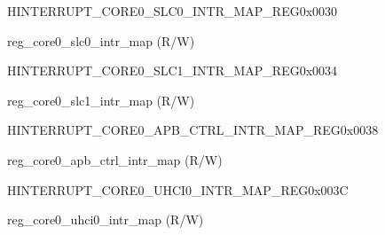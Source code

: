 \begin{register}{H}{INTERRUPT\_CORE0\_SLC0\_INTR\_MAP\_REG}{0x0030}\label{regdesc:INTERRUPTCORE0SLC0INTRMAPREG}
%
%
\regnewline%
\begin{regdesc}\begin{reglist}
\label{fielddesc:INTERRUPTCORE0SLC0INTRMAP}\item [INTERRUPT\_CORE0\_SLC0\_INTR\_MAP] reg\_core0\_slc0\_intr\_map (R/W)
\end{reglist}\end{regdesc}
\end{register}


\begin{register}{H}{INTERRUPT\_CORE0\_SLC1\_INTR\_MAP\_REG}{0x0034}\label{regdesc:INTERRUPTCORE0SLC1INTRMAPREG}
%
%
\regnewline%
\begin{regdesc}\begin{reglist}
\label{fielddesc:INTERRUPTCORE0SLC1INTRMAP}\item [INTERRUPT\_CORE0\_SLC1\_INTR\_MAP] reg\_core0\_slc1\_intr\_map (R/W)
\end{reglist}\end{regdesc}
\end{register}


\begin{register}{H}{INTERRUPT\_CORE0\_APB\_CTRL\_INTR\_MAP\_REG}{0x0038}\label{regdesc:INTERRUPTCORE0APBCTRLINTRMAPREG}
%
%
\regnewline%
\begin{regdesc}\begin{reglist}
\label{fielddesc:INTERRUPTCORE0APBCTRLINTRMAP}\item [INTERRUPT\_CORE0\_APB\_CTRL\_INTR\_MAP] reg\_core0\_apb\_ctrl\_intr\_map (R/W)
\end{reglist}\end{regdesc}
\end{register}


\begin{register}{H}{INTERRUPT\_CORE0\_UHCI0\_INTR\_MAP\_REG}{0x003C}\label{regdesc:INTERRUPTCORE0UHCI0INTRMAPREG}
%
%
\regnewline%
\begin{regdesc}\begin{reglist}
\label{fielddesc:INTERRUPTCORE0UHCI0INTRMAP}\item [INTERRUPT\_CORE0\_UHCI0\_INTR\_MAP] reg\_core0\_uhci0\_intr\_map (R/W)
\end{reglist}\end{regdesc}
\end{register}


